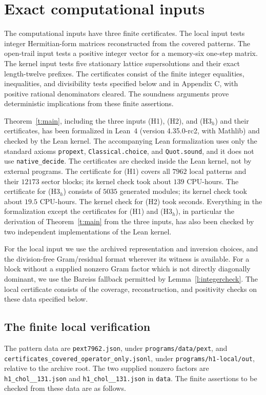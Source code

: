 
\section{Exact computational inputs}\label{s:inputs}

The computational inputs have three finite certificates. The local
input tests integer Hermitian-form matrices reconstructed from the
covered patterns. The open-trail input tests a positive integer
vector for a memory-six one-step matrix. The kernel input
tests five stationary lattice supersolutions and their exact
length-twelve prefixes. The certificates consist of the finite
integer equalities, inequalities, and divisibility tests specified
below and in Appendix C, with positive rational denominators cleared.
The soundness arguments prove deterministic implications from these
finite assertions.

Theorem~\ref{t:main}, including the three inputs (H1), (H2), and
(H3\(_h\)) and their certificates, has been formalized in Lean~4
(version 4.35.0-rc2, with Mathlib) and checked by the Lean kernel.
The accompanying Lean formalization %
uses only the standard axioms \texttt{propext},
\texttt{Classical.choice}, and \texttt{Quot.sound}, and it does not
use \texttt{native\_decide}. The certificates are checked inside the
Lean kernel, not by external programs. The certificate for (H1)
covers all \(7962\) local patterns and their \(12173\) sector
blocks; its kernel check took about \(139\) CPU-hours. The
certificate for (H3\(_h\)) consists of \(5035\) generated modules;
its kernel check took about \(19.5\) CPU-hours. The kernel check
for (H2) took seconds. Everything in the formalization except the
certificates for (H1) and (H3\(_h\)), in particular the derivation
of Theorem~\ref{t:main} from the three inputs, has also been checked
by two independent implementations of the Lean kernel.

For the local input we use the archived representation and inversion
choices, and the division-free Gram/residual format wherever its
witness is available. For a block without a supplied nonzero Gram
factor which is not directly diagonally dominant, we use the
Bareiss fallback permitted by Lemma~\ref{l:integercheck}. The local
certificate consists of the coverage, reconstruction, and positivity
checks on these data specified below.

\subsection*{The finite local verification}
The pattern data are \texttt{pext7962.json}, under
\texttt{programs/data/pext}, and
\texttt{certificates\_covered\_operator\_only.jsonl}, under
\texttt{programs/h1-local/out}, relative to the archive root.
The two supplied nonzero factors are
\texttt{h1\_chol\_\_\allowbreak131.json} and
\texttt{h1\_chol\_\_\allowbreak131.json} in \texttt{data}.
The finite assertions to be checked from these data are as follows.

